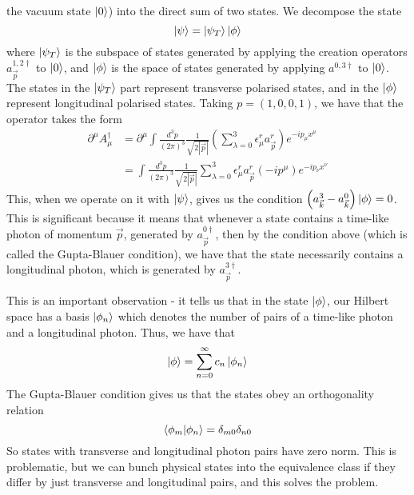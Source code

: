 the vacuum state $ \ket{ 0 } $) into the direct sum of two states. 
We decompose the state 
\[
 \ket{ \psi } = \ket{ \psi _ T } \ket{ \phi } 
\] where $ \ket{ \psi _ T } $ is the subspace of states generated 
by applying the creation operators $ a ^{ 1, 2 \dagger } _{  \vec{p}}  $ to 
$ \ket{ 0 } $, and $ \ket{ \phi } $ is the 
space of states generated by applying $ a ^{ 0 , 3\dagger  } $ to $ \ket{ 0 } $. 
The states in the $ \ket{ \psi _ T } $ part represent transverse 
polarised states, and in the $ \ket{ \phi } $  represent longitudinal 
polarised states. 
Taking $ p = ( 1, 0 , 0 , 1) $, we have that the operator 
takes the form 
\begin{align*}
	\partial  ^ \mu A _ \mu ^ \dagger &=  \partial  ^ \mu \int 
	\frac{d ^ 3 p }{ ( 2 \pi )^{ 3 }  } \frac{1}{\sqrt{ 2 |\vec{p} | }  } 
	\left( \sum_{ \lambda = 0 } ^ 3 \epsilon _ \mu ^ r a_{\vec{p} } ^ r  \right)  
	e ^{ - i p _ \mu x ^ \mu } \\ 
	&=  \int \frac{d ^ 3 p  }{ ( 2 \pi )^{ 3 }  } \frac{1}{\sqrt{ 2 | \vec{p} | }  } 
	\sum _{ \lambda = 0 } ^ 3 \epsilon _ \mu ^ r a_{\vec{p} } ^ r \left(  - i p ^ \mu  \right) 
	e ^{ - i p _ \nu x ^ \nu } 
\end{align*}
This, when we operate on it with $ \ket{ \psi } $, gives us the 
condition $ \left( a _{ \vec{k} } ^ 3 - a _{ \vec{k} } ^ 0  \right)  \ket{ \phi }  =0  $. 
This is significant because it means that 
whenever a state contains a time-like photon 
of momentum $ \vec{p}$, generated by $ a _{ \vec{p} } ^{ 0 \dagger}$, then by the condition above 
(which is called the Gupta-Blauer condition), we have 
that the state necessarily contains a longitudinal 
photon, which is generated by $ a_{ \vec{p} } ^{ 3 \dagger } $. 

This is an important observation - it tells us 
that in the state $ \ket{ \phi } $, our 
Hilbert space has a basis $ \ket{ \phi _ n } $ which 
denotes the number of pairs of a time-like 
photon and a longitudinal photon. 
Thus, we have that 
\[
 \ket{ \phi } = \sum_{ n = 0 } ^\infty c _ n \ket{ \phi _ n } 
\] The Gupta-Blauer condition gives us 
that the states obey an orthogonality relation
\[
 \bra{ \phi_ m }\ket{ \phi _ n }  = \delta_{ m 0   } \delta _{ n  0}
\] So states with transverse and longitudinal photon pairs 
have zero norm. This is problematic, but we 
can bunch physical states into the equivalence class if they 
differ by just transverse and longitudinal pairs, and 
this solves the problem. 

